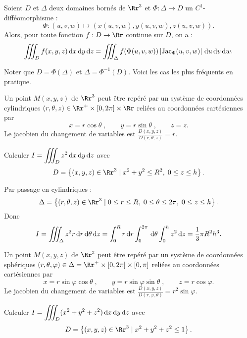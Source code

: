 \documentclass[class=report,crop=false]{standalone}
\begin{document}
\vskip4mm

\begin{theoreme}Soient $D$ et $\Delta$ deux domaines bornés de $\Rr^3$ et $\Phi :\Delta \to D$ un $C^1$-difféomorphisme :
$$\Phi :(u,v,w)\mapsto (x(u,v,w),y(u,v,w),z(u,v,w)).$$
Alors, pour toute fonction $f:D\to \Rr$ continue sur $D$, on a :
$$\int \!\!\!\!\int \!\!\!\!\int _Df(x,y,z)\d x\d y\d z=\int \!\!\!\!\int  \!\!\!\!\int _{\Delta}f(\Phi (u,v,w))\left|\jac _{\Phi}(u,v,w)\right|\d u\d v\d w.$$
\end{theoreme}

\vskip6mm

\noindent Noter que $D=\Phi (\Delta )$ et $\Delta =\Phi ^{-1}(D)$. Voici les cas les plus fréquents en pratique.

\vskip6mm

Un point $M(x,y,z)$ de $\Rr^3$ peut \^etre repéré par un système de coordonnées cylindriques $(r,\theta ,z)\in \Rr^+\times [0,2\pi ]\times \Rr$ reliées au coordonnées cartésiennes par
$$x=r\cos \theta \; ,\qquad y=r\sin \theta \; ,\qquad z=z.$$
Le jacobien du changement de variables est $\displaystyle \frac{D(x,y,z)}{D(r,\theta ,z)}=r$.

\vskip6mm

Calculer $\displaystyle I=\int \!\!\!\!\int \!\!\!\!\int _Dz^2\d x\d y\d z$ avec 
$$D=\left\{(x,y,z)\in \Rr^3\mid x^2+y^2\leq R^2,\; 0\leq z\leq h\right\}.$$

\noindent Par passage en cylindriques :
$$\Delta =\left\{(r,\theta ,z)\in \Rr^3\mid 0\leq r\leq R,\; 0\leq \theta \leq 2\pi,\; 0\leq z\leq h\right\}.$$
Donc
$$I=\int \!\!\!\!\int \!\!\!\!\int _{\Delta}z^2r\d r\d \theta \d z=\int _0^Rr\d r\int _0^{2\pi}\d \theta\int _{0}^hz^2\d z=\frac{1}{3}\pi R^2h^3.$$

\vskip6mm

Un point $M(x,y,z)$ de $\Rr^3$ peut \^etre repéré par un système de coordonnées sphériques $\displaystyle (r,\theta ,\varphi)\in \Delta =\Rr^+\times [0,2\pi]\times [0,\pi ]$ reliées au coordonnées cartésiennes par
$$x=r\sin \varphi \cos \theta \; ,\qquad y=r\sin \varphi \sin \theta \; ,\qquad z=r\cos \varphi .$$
Le jacobien du changement de variables est $\displaystyle \frac{D(x,y,z)}{D(r,\varphi ,\theta )}=r^2\sin \varphi$.

\vskip6mm

Calculer $\displaystyle I=\int \!\!\!\!\int \!\!\!\!\int _D(x^2+y^2+z^2)\d x\d y\d z$ avec 
$$D=\left\{(x,y,z)\in \Rr^3\mid x^2+y^2+z^2\leq 1\right\}.$$
\end{document}
